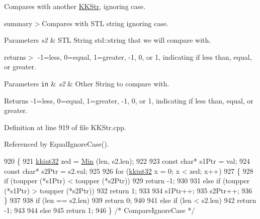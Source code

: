 Compares with another \hyperlink{class_k_k_b_1_1_k_k_str}{K\+K\+Str}, ignoring case. 

summary$>$Compares with S\+TL string ignoring case. 


\begin{DoxyParams}{Parameters}
{\em s2} & S\+TL String std\+::string that we will compare with. \\
\hline
\end{DoxyParams}
returns$>$ -\/1=less, 0=equal, 1=greater, -\/1, 0, or 1, indicating if less than, equal, or greater. 


\begin{DoxyParams}[1]{Parameters}
\mbox{\tt in}  & {\em s2} & Other String to compare with. \\
\hline
\end{DoxyParams}
\begin{DoxyReturn}{Returns}
-\/1=less, 0=equal, 1=greater, -\/1, 0, or 1, indicating if less than, equal, or greater. 
\end{DoxyReturn}


Definition at line 919 of file K\+K\+Str.\+cpp.



Referenced by Equal\+Ignore\+Case().


\begin{DoxyCode}
920 \{
921   \hyperlink{namespace_k_k_b_a8fa4952cc84fda1de4bec1fbdd8d5b1b}{kkint32}  zed = \hyperlink{namespace_k_k_b_ad030d1ca8bd5038824c4a923a4d23fb5}{Min} (len, s2.len);
922 
923   \textcolor{keyword}{const} \textcolor{keywordtype}{char}*  s1Ptr = val;
924   \textcolor{keyword}{const} \textcolor{keywordtype}{char}*  s2Ptr = s2.val;
925 
926   \textcolor{keywordflow}{for}  (\hyperlink{namespace_k_k_b_a8fa4952cc84fda1de4bec1fbdd8d5b1b}{kkint32} x = 0;  x < zed;  x++)
927   \{
928     \textcolor{keywordflow}{if}  (toupper (*s1Ptr) < toupper (*s2Ptr))
929       \textcolor{keywordflow}{return} -1;
930 
931     \textcolor{keywordflow}{else} \textcolor{keywordflow}{if}  (toupper (*s1Ptr) > toupper (*s2Ptr))
932       \textcolor{keywordflow}{return} 1;
933 
934     s1Ptr++;
935     s2Ptr++;
936   \}
937 
938   \textcolor{keywordflow}{if}  (len == s2.len)
939     \textcolor{keywordflow}{return} 0;
940 
941   \textcolor{keywordflow}{else} \textcolor{keywordflow}{if}  (len < s2.len)
942     \textcolor{keywordflow}{return} -1;
943 
944   \textcolor{keywordflow}{else} 
945     \textcolor{keywordflow}{return} 1;
946 \}  \textcolor{comment}{/* CompareIgnoreCase */}
\end{DoxyCode}
